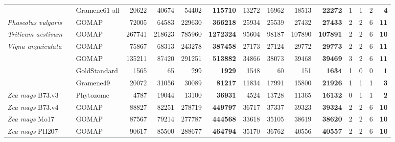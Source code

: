 \documentclass[utf8]{frontiersSCNS}
\begin{document}
\begin{table}[t]
{\begin{threeparttable}
\begin{tabular}{lrlrrr>{\bfseries}r|rrr>{\bfseries}r|rrr>{\bfseries}r}
\rowcolor{gray!6}  \multirow{-4}{*}{\raggedright\arraybackslash \textit{Oryza sativa}} &  & Gramene61-all & 20622 & 40674 & 54402 & 115710 & 13272 & 16962 & 18513 & 22272 & 1 & 1 & 2 & 4\\

\textit{Phaseolus vulgaris} &  & GOMAP & 72005 & 64583 & 229630 & 366218 & 25934 & 25539 & 27432 & 27433 & 2 & 2 & 6 & 11\\

\rowcolor{gray!6}  \textit{Triticum aestivum} &  & GOMAP & 267741 & 218623 & 785960 & 1272324 & 95604 & 98187 & 107890 & 107891 & 2 & 2 & 6 & 10\\

\textit{Vigna unguiculata} &  & GOMAP & 75867 & 68313 & 243278 & 387458 & 27173 & 27124 & 29772 & 29773 & 2 & 2 & 6 & 11\\

\rowcolor{gray!6}   &  & GOMAP & 135211 & 87420 & 291251 & 513882 & 34866 & 38073 & 39468 & 39469 & 3 & 2 & 6 & 11\\

 &  & GoldStandard & 1565 & 65 & 299 & 1929 & 1548 & 60 & 151 & 1634 & 1 & 0 & 0 & 1\\

\rowcolor{gray!6}   &  & Gramene49 & 20072 & 31056 & 30089 & 81217 & 11834 & 17991 & 15800 & 21926 & 1 & 1 & 1 & 3\\

\multirow{-4}{*}{\raggedright\arraybackslash \textit{Zea mays} B73.v3} &  & Phytozome & 4787 & 19044 & 13100 & 36931 & 4524 & 13728 & 11365 & 16132 & 0 & 1 & 1 & 2\\

\rowcolor{gray!6}  \textit{Zea mays} B73.v4 &  & GOMAP & 88827 & 82251 & 278719 & 449797 & 36717 & 37337 & 39323 & 39324 & 2 & 2 & 6 & 10\\

\textit{Zea mays} Mo17 &  & GOMAP & 87567 & 79214 & 277787 & 444568 & 33618 & 35105 & 38619 & 38620 & 2 & 2 & 6 & 10\\

\rowcolor{gray!6}  \textit{Zea mays} PH207 &  & GOMAP & 90617 & 85500 & 288677 & 464794 & 35170 & 36762 & 40556 & 40557 & 2 & 2 & 6 & 10\\


\end{tabular}
\end{threeparttable}}
\end{table}
\end{document}
